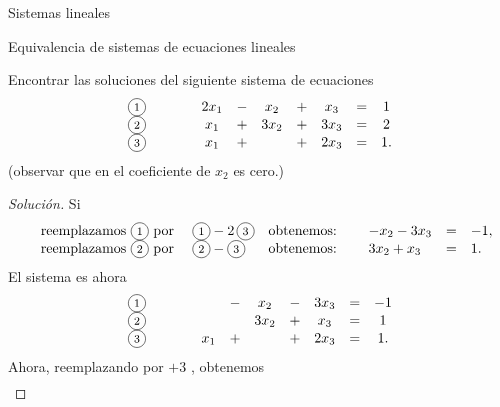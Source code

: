 \begin{chapter}{Sistemas lineales}
\begin{section}{Equivalencia de sistemas de ecuaciones lineales}
            \begin{ejemplo*}
                Encontrar las soluciones del siguiente sistema de ecuaciones
                \begin{equation*}
                \begin{matrix}
                \text{\footnotesize\circled{1}}&\qquad& 2x_1 &-&x_2 &+& x_3 &=& 1 \\
                \text{\footnotesize\circled{2}}&\qquad& x_1 &+& 3x_2 &+& 3x_3 &=&  2 \\
                \text{\footnotesize\circled{3}}&\qquad& x_1 &+& &+& 2x_3 &=&   1 .
                \end{matrix}
                \end{equation*}
                (observar que en {\footnotesize{}} el coeficiente de $x_2$ es cero.)
            \end{ejemplo*}
            \begin{proof}[Solución] Si
                \begin{align*}
                \begin{matrix*}[l]
                &\text{reemplazamos {\footnotesize\circled{1}} por }&\text{\footnotesize\circled{1}}-2\,\text{\footnotesize\circled{3}}  & \text{obtenemos:} & &\; -x_2 - 3x_3&=&-1, \\
                &\text{reemplazamos {\footnotesize\circled{2}} por }&\text{\footnotesize\circled{2}} - \text{\footnotesize\circled{3}}& \text{obtenemos:} & &\; 3x_2 + x_3&=& 1.
                \end{matrix*}
                \end{align*}
                El sistema es ahora
                \begin{equation*}
                    \begin{matrix}
                    \text{\footnotesize\circled{1}}&\qquad&  &-&x_2 &-&3 x_3 &=& -1 \\
                    \text{\footnotesize\circled{2}}&\qquad&  && 3x_2 &+& x_3 &=& 1 \\
                    \text{\footnotesize\circled{3}}&\qquad& x_1 &+& &+& 2x_3 &=&   1 .
                    \end{matrix}
                    \end{equation*}
                Ahora, reemplazando  {\footnotesize{}} por  {\footnotesize{}} $+3$ {\footnotesize{}}, obtenemos
                \begin{equation*}
                    \begin{matrix}

\end{matrix}
\end{equation*}
\end{proof}
\end{section}
\end{chapter}
